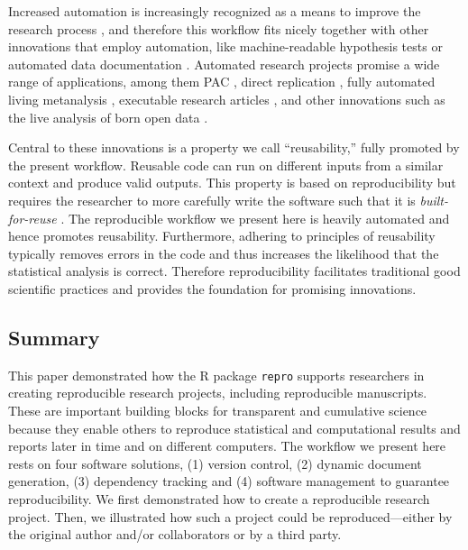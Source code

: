 \documentclass[psych,tutorial,submit,moreauthors,pdftex]{mdpi}
\begin{document}
Increased automation is increasingly recognized as a means to improve
the research process \citep{rouderMinimizingMistakesPsychological2019},
and therefore this workflow fits nicely together with other innovations
that employ automation, like machine-readable hypothesis tests
\citep{lakensImprovingTransparencyFalsifiability2021} or automated data
documentation \citep{arslanHowAutomaticallyDocument2019}. Automated
research projects promise a wide range of applications, among them PAC
\citep[potentially to be submitted as a registered
report][]{nosekRegisteredReports2014, chambersWhatNextRegistered2019},
direct replication \citep{simonsValueDirectReplication2014}, fully
automated living metanalysis \citep{elliottLivingSystematicReviews2014},
executable research articles
\citep{elifesciencespublicationsELifeLaunchesExecutable2020}, and other
innovations such as the live analysis of born open data
\citep{rouderWhatWhyHow2016, kekecsRaisingValueResearch2019}.

Central to these innovations is a property we call ``reusability,''
fully promoted by the present workflow. Reusable code can run on
different inputs from a similar context and produce valid outputs. This
property is based on reproducibility but requires the researcher to more
carefully write the software
\citep{lanerganSoftwareEngineeringReusable1989} such that it is
\emph{built-for-reuse}
\citep{al-badareenReusableSoftwareComponents2010}. The reproducible
workflow we present here is heavily automated and hence promotes
reusability. Furthermore, adhering to principles of reusability
typically removes errors in the code and thus increases the likelihood
that the statistical analysis is correct. Therefore reproducibility
facilitates traditional good scientific practices and provides the
foundation for promising innovations.

\hypertarget{summary-1}{%
\subsection{Summary}\label{summary-1}}

This paper demonstrated how the R package \texttt{repro} supports
researchers in creating reproducible research projects, including
reproducible manuscripts. These are important building blocks for
transparent and cumulative science because they enable others to
reproduce statistical and computational results and reports later in
time and on different computers. The workflow we present here rests on
four software solutions, (1) version control, (2) dynamic document
generation, (3) dependency tracking and (4) software management to
guarantee reproducibility. We first demonstrated how to create a
reproducible research project. Then, we illustrated how such a project
could be reproduced---either by the original author and/or collaborators
or by a third party.
\end{document}
